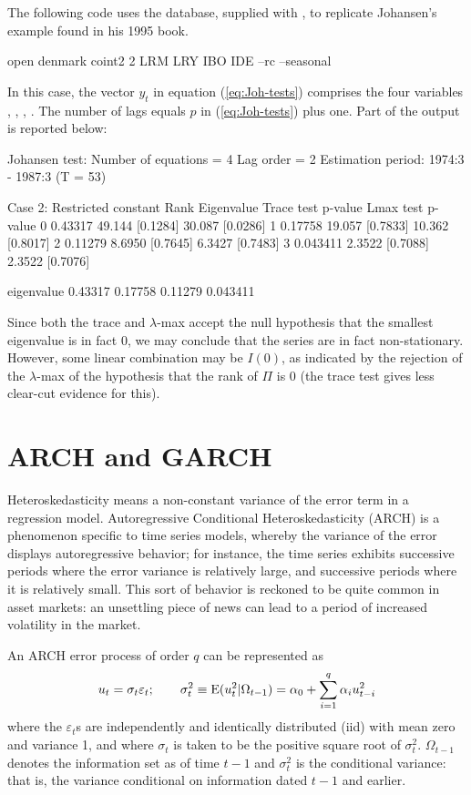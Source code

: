 The following code uses the  database, supplied with
, to replicate Johansen's example found in his 1995 book.
\begin{code}
  open denmark
  coint2 2 LRM LRY IBO IDE --rc --seasonal
\end{code}
In this case, the vector $y_t$ in equation (\ref{eq:Joh-tests})
comprises the four variables , , ,
. The number of lags equals $p$ in (\ref{eq:Joh-tests}) plus
one. Part of the output is reported below:
\begin{center}
\begin{code}
Johansen test:
Number of equations = 4
Lag order = 2
Estimation period: 1974:3 - 1987:3 (T = 53)

Case 2: Restricted constant
Rank Eigenvalue Trace test p-value   Lmax test  p-value
   0    0.43317     49.144 [0.1284]     30.087 [0.0286]
   1    0.17758     19.057 [0.7833]     10.362 [0.8017]
   2    0.11279     8.6950 [0.7645]     6.3427 [0.7483]
   3   0.043411     2.3522 [0.7088]     2.3522 [0.7076]

eigenvalue     0.43317      0.17758      0.11279     0.043411 
\end{code}
\end{center}
Since both the trace and $\lambda$-max accept the null hypothesis that
the smallest eigenvalue is in fact 0, we may conclude that the series
are in fact non-stationary. However, some linear combination may be
$I(0)$, as indicated by the rejection of the $\lambda$-max of the
hypothesis that the rank of $\Pi$ is 0 (the trace test gives less
clear-cut evidence for this).

\section{ARCH and GARCH}
\label{sec:arch-garch}

Heteroskedasticity means a non-constant variance of the error term in
a regression model.  Autoregressive Conditional Heteroskedasticity
(ARCH) is a phenomenon specific to time series models, whereby the
variance of the error displays autoregressive behavior; for instance,
the time series exhibits successive periods where the error variance
is relatively large, and successive periods where it is relatively
small.  This sort of behavior is reckoned to be quite common in asset
markets: an unsettling piece of news can lead to a period of increased
volatility in the market.

An ARCH error process of order $q$ can be represented as
\[
u_t = \sigma_t \varepsilon_t; \qquad
\sigma^2_t \equiv {\rm E}(u^2_t|\Omega_{t-1}) = 
\alpha_0 + \sum_{i=1}^q \alpha_i u^2_{t-i}
\]
where the $\varepsilon_t$s are independently and identically
distributed (iid) with mean zero and variance 1, and where $\sigma_t$
is taken to be the positive square root of $\sigma^2_t$.
$\Omega_{t-1}$ denotes the information set as of time $t-1$ and
$\sigma^2_t$ is the conditional variance: that is, the
variance conditional on information dated $t-1$ and earlier.

